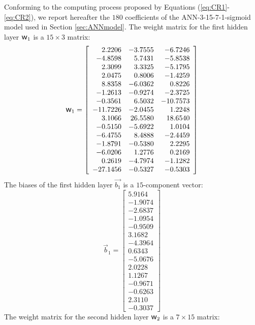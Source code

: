 \documentclass[metals,article,submit,pdftex,moreauthors]{Definitions/mdpi}
\DeclareRobustCommand{\w}{\mbox{\large\ensuremath{\mathsf{w}}}}
\begin{document}
Conforming to the computing process proposed by Equations (\ref{eq:CR1}-\ref{eq:CR2}), we report hereafter the $180$ coefficients of the ANN-3-15-7-1-sigmoid model used in Section \ref{sec:ANNmodel}.
The weight matrix for the first hidden layer $\w_1$ is a $15\times3$ matrix:
\begin{equation*}
\w_1 = \left[
\begin{array}{rrr}
2.2206 & -3.7555 & -6.7246 \\
-4.8598 & 5.7431 & -5.8538 \\
2.3099 & 3.3325 & -5.1795 \\
2.0475 & 0.8006 & -1.4259 \\
8.8358 & -6.0362 & 0.8226 \\
-1.2613 & -0.9274 & -2.3725 \\
-0.3561 & 6.5032 & -10.7573 \\
-11.7226 & -2.0455 & 1.2248 \\
3.1066 & 26.5580 & 18.6540 \\
-0.5150 & -5.6922 & 1.0104 \\
-6.4755 & 8.4888 & -2.4459 \\
-1.8791 & -0.5380 & 2.2295 \\
-6.0206 & 1.2776 & 0.2169 \\
0.2619 & -4.7974 & -1.1282 \\
-27.1456 & -0.5327 & -0.5303
\end{array}\right]
\end{equation*}
The biases of the first hidden layer $\overrightarrow{b_1}$ is a $15$-component vector:
\begin{equation*}
\overrightarrow{b}_1 = \left[
\begin{array}{r}
5.9164 \\
-1.9074 \\
-2.6837 \\
-1.0954 \\
-0.9509 \\
3.1682 \\
-4.3964 \\
0.6343 \\
-5.0676 \\
2.0228 \\
1.1267 \\
-0.9671 \\
-0.6263 \\
2.3110 \\
-0.3037
\end{array}\right]
\end{equation*}
The weight matrix for the second hidden layer $\w_2$ is a $7\times15$ matrix:
\end{document}
